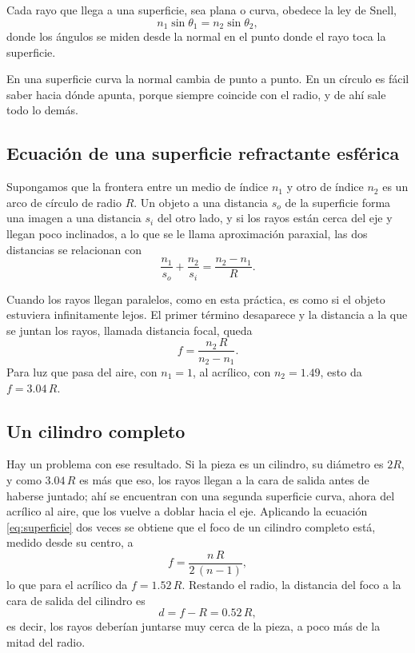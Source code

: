 Cada rayo que llega a una superficie, sea plana o curva, obedece la ley de Snell,
\begin{equation}
n_1 \sin\theta_1 = n_2 \sin\theta_2 ,
\label{eq:snell}
\end{equation}
donde los ángulos se miden desde la normal en el punto donde el rayo toca la superficie.

En una superficie curva la normal cambia de punto a punto. En un círculo es fácil saber hacia dónde apunta, porque siempre coincide con el radio, y de ahí sale todo lo demás.

\subsection{Ecuación de una superficie refractante esférica}
Supongamos que la frontera entre un medio de índice $n_1$ y otro de índice $n_2$ es un arco de círculo de radio $R$. Un objeto a una distancia $s_o$ de la superficie forma una imagen a una distancia $s_i$ del otro lado, y si los rayos están cerca del eje y llegan poco inclinados, a lo que se le llama aproximación paraxial, las dos distancias se relacionan con
\begin{equation}
\frac{n_1}{s_o} + \frac{n_2}{s_i} = \frac{n_2 - n_1}{R} .
\label{eq:superficie}
\end{equation}

Cuando los rayos llegan paralelos, como en esta práctica, es como si el objeto estuviera infinitamente lejos. El primer término desaparece y la distancia a la que se juntan los rayos, llamada distancia focal, queda
\begin{equation}
f = \frac{n_2 \, R}{n_2 - n_1} .
\label{eq:focal}
\end{equation}
Para luz que pasa del aire, con $n_1 = 1$, al acrílico, con $n_2 = 1.49$, esto da $f = 3.04 \, R$.

\subsection{Un cilindro completo}
Hay un problema con ese resultado. Si la pieza es un cilindro, su diámetro es $2R$, y como $3.04\,R$ es más que eso, los rayos llegan a la cara de salida antes de haberse juntado; ahí se encuentran con una segunda superficie curva, ahora del acrílico al aire, que los vuelve a doblar hacia el eje. Aplicando la ecuación \eqref{eq:superficie} dos veces se obtiene que el foco de un cilindro completo está, medido desde su centro, a
\begin{equation}
f = \frac{n \, R}{2 \, (n - 1)} ,
\label{eq:cilindro}
\end{equation}
lo que para el acrílico da $f = 1.52 \, R$. Restando el radio, la distancia del foco a la cara de salida del cilindro es
\begin{equation}
d = f - R = 0.52 \, R ,
\label{eq:distancia}
\end{equation}
es decir, los rayos deberían juntarse muy cerca de la pieza, a poco más de la mitad del radio.

